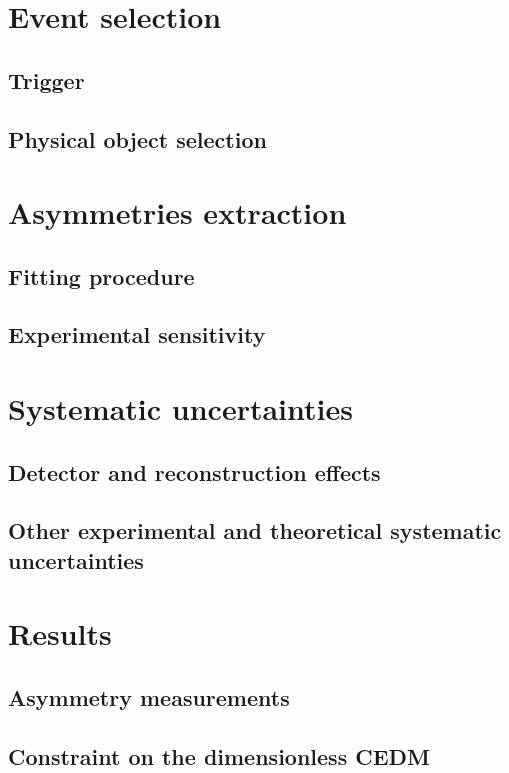 \documentclass[10pt,a4paper,twoside]{report}
\begin{document}
\begin{sloppypar}
\chapter{Event selection}
    \section{Trigger}
    
    \section{Physical object selection}
    
\chapter{Asymmetries extraction}\label{sec:fitresult}
    \section{Fitting procedure}
    
    \section{Experimental sensitivity}
    
\chapter{Systematic uncertainties}\label{sec:uncertainty}
    
    \section{Detector and reconstruction effects}
    
    \section{Other experimental and theoretical systematic uncertainties}
    
\chapter{Results}\label{sec:results}
    \section{Asymmetry measurements}
    
    \section{Constraint on the dimensionless CEDM}
    

\end{sloppypar}
\end{document}

